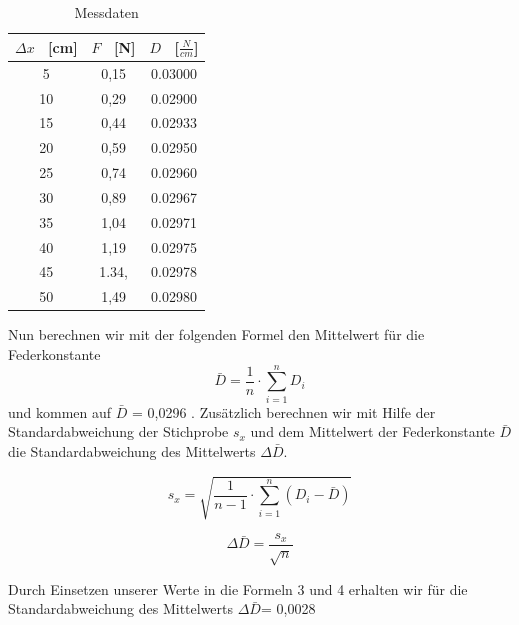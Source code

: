 \documentclass[titlepage = firstcover]{scrartcl}
\begin{document}
        \begin{table}[h]
          \centering
          \caption{Messdaten}
          \label{tab:Tabelle_1}
          
          \begin{tabular}{c c c}
              \toprule
              {$\Delta x$ \ [cm]} & {$F$ \ [N]} & {$D$ \ [$\frac{N}{cm}$]}\\
              \midrule
              5 & 0,15 & 0.03000\\
              10 & 0,29 & 0.02900\\
              15 & 0,44 & 0.02933\\
              20 & 0,59 & 0.02950\\
              25 & 0,74 & 0.02960\\
              30 & 0,89 & 0.02967\\
              35 & 1,04 & 0.02971\\
              40 & 1,19 & 0.02975\\
              45 & 1.34, & 0.02978\\
              50 & 1,49 & 0.02980\\
              \bottomrule
          \end{tabular}    
      \end{table}

      \newpage
      Nun berechnen wir mit der folgenden Formel den Mittelwert für die Federkonstante 
        \begin{equation}
          \bar{D} = \frac{1}{n} \cdot \sum_{i=1}^{n} D_{i}
        \end{equation}  
      und kommen auf $\bar{D}$ = 0,0296 . Zusätzlich berechnen wir mit Hilfe der Standardabweichung der Stichprobe $s_x$ und dem 
      Mittelwert der Federkonstante $\bar{D}$ die Standardabweichung des Mittelwerts $\Delta \bar{D}$.
      
        
        \begin{equation}
          s_x = \sqrt{\frac{1}{n-1} \cdot \sum_{i=1}^{n} (D_i - \bar{D})}
        \end{equation}
      
        \begin{equation}
          \Delta \bar{D}=\frac{s_x}{\sqrt{n}} 
        \end{equation}
      
        Durch Einsetzen unserer Werte in die Formeln 3 und 4 erhalten wir für die Standardabweichung des
        Mittelwerts $\Delta \bar{D}$= 0,0028 
      
\end{document}
